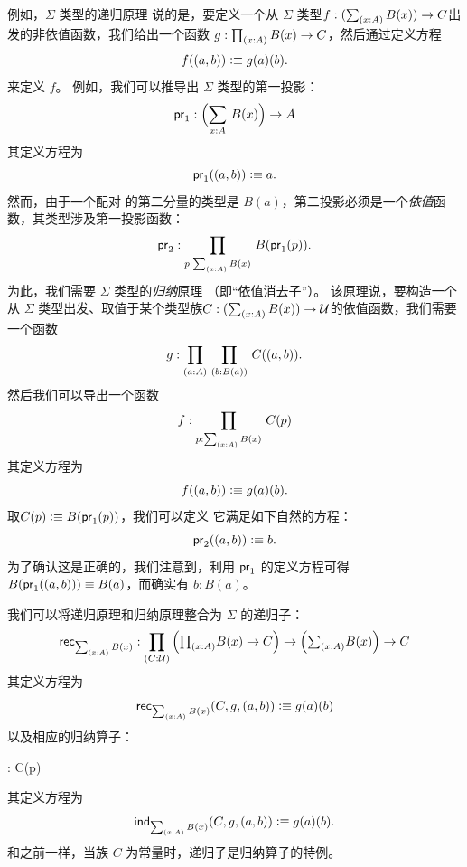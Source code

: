 例如，$\Sigma$ 类型的递归原理%
说的是，要定义一个从 $\Sigma$ 类型$f : (\sm{x:A} B(x)) \to C$出发的非依值函数，我们给出一个函数
$g : \prd{x:A} B(x) \to C$，然后通过定义方程
\[ f((a,b)) \vcentcolon\equiv g(a)(b). \]
来定义 $f$。
%
例如，我们可以推导出 $\Sigma$ 类型的第一投影：
%
\begin{equation*}
  \fst : \Parens{\sm{x : A}B(x)} \to A
\end{equation*}
其定义方程为
\begin{equation*}
  \mathsf{pr}_{1}((a,b)) \vcentcolon\equiv a.
\end{equation*}
然而，由于一个配对
的第二分量的类型是 $B(a)$，第二投影必须是一个\emph{依值}函数，其类型涉及第一投影函数：
%
\[ \snd : \prd{p:\sm{x : A}B(x)}B(\fst(p)). \]
为此，我们需要 $\Sigma$ 类型的\emph{归纳}原理%
（即``依值消去子''）。
该原理说，要构造一个从 $\Sigma$ 类型出发、取值于某个类型族$C : (\sm{x:A} B(x)) \to \UU$的依值函数，我们需要一个函数
\[ g : \prd{a:A}{b:B(a)} C(\tup{a}{b}). \]
然后我们可以导出一个函数
\[ f : \prd{p : \sm{x:A}B(x)} C(p) \]
其定义方程为
\[ f((a,b)) \vcentcolon\equiv g(a)(b).\]
取$C(p)\vcentcolon\equiv B(\mathsf{pr}_{1}(p))$，我们可以定义
它满足如下自然的方程：
\[ \mathsf{pr}_{2}((a,b))  \vcentcolon\equiv  b. \]
为了确认这是正确的，我们注意到，利用 $\mathsf{pr}_{1}$ 的定义方程可得$B (\mathsf{pr}_{1}((a,b))) \equiv B(a)$，而确实有 $b : B(a)$。

我们可以将递归原理和归纳原理整合为 $\Sigma$ 的递归子：
%
\[ \rec{\sm{x:A}B(x)} : \dprd{C:\UU}\Parens{\tprd{x:A} B(x) \to C} \to
\Parens{\tsm{x:A}B(x)} \to C \]
其定义方程为
\[ \rec{\sm{x:A}B(x)}(C,g,\tup{a}{b}) \defeq g(a)(b) \]
以及相应的归纳算子：
%
\begin{narrowmultline*}
   : \narrowbreak
    \to {} C(p)
\end{narrowmultline*}
其定义方程为
\[ \ind{\sm{x:A}B(x)}(C,g,\tup{a}{b}) \defeq g(a)(b). \]
和之前一样，当族 $C$ 为常量时，递归子是归纳算子的特例。

